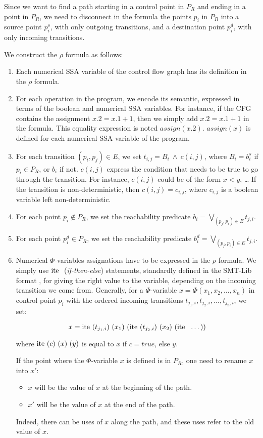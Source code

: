 \documentclass[a4paper,english,titlepage,11pt]{report}
\def\ite{\textnormal{ite\ }}
\begin{document}
	Since we want to find a path starting in a control point in $P_R$ and ending
	in a point in $P_R$, we need to disconnect in the formula the points $p_i$
	in $P_R$ into a source point $p_i^s$, with only outgoing transitions, and a
	destination point $p_i^d$, with only incoming transitions. 

	We construct the $\rho$ formula as follows:

\begin{enumerate}
\item Each numerical SSA variable of the control flow graph has its definition
in the $\rho$ formula.
\item For each operation in the program, we encode its semantic, expressed in
terms of the boolean and numerical SSA variables. For instance, if the CFG
contains the assignment $x.2 = x.1 + 1$, then we simply add $x.2 = x.1 + 1$ in
the formula. This equality expression is noted $assign(x.2)$. 
$assign(x)$ is defined for each numerical SSA-variable of the program.
\item For each transition $(p_i,p_j) \in E$, we set $t_{i,j} = B_i\ \wedge \
c(i,j)$, where $B_i = b_i^s$ if $p_i \in P_R$, or $b_i$ if not.
$c(i,j)$ express the condition that needs to be true to go through the
transition. For instance, $c(i,j)$ could be of the form $x < y$, \dots
If the transition is non-deterministic, then $c(i,j) = c_{i,j}$, where
$c_{i,j}$ is a boolean variable left non-deterministic.
\item For each point $p_i \notin P_R$, we set the reachability predicate 
$b_i = \displaystyle \bigvee_{(p_j,p_i)\in E} t_{j,i}$.
\item For each point $p_i^d \in P_R$, we set the reachability predicate 
$b_i^d = \displaystyle \bigvee_{(p_j,p_i)\in E} t_{j,i}$. 
\item Numerical $\Phi$-variables assignations have to be expressed in the $\rho$
formula. We simply use $\ite$ (\emph{if-then-else}) statements, standardly defined in the
SMT-Lib format \cite{BarST-SMTLIB}, for giving the right value to the variable,
depending on the incoming transition we come from. Generally, for a
$\Phi$-variable $x = \Phi(x_1,x_2,\dots,x_n)$ in control point $p_i$ with the
ordered incoming transitions $t_{j_1,i},t_{j_2,i},\dots,t_{j_n,i}$, we set:

$$x = \ite (t_{j_1,i})\  (x_1)\  (\ite (t_{j_2,i})\  (x_2)\  (\ite\  \dots))$$

where $\ite (c)\ (x)\ (y)$ is equal to $x$ if $c = true$, else $y$.

If the point where the $\Phi$-variable $x$ is defined is in
$P_R$, one need to rename $x$ into $x'$:
\begin{itemize}
\item $x$ will be the value of $x$ at the beginning of the path.
\item $x'$ will be the value of $x$ at the end of the path.
\end{itemize}
Indeed, there can be uses of $x$ along the path, and these uses refer to the
old value of $x$. 
\end{enumerate}
\end{document}
